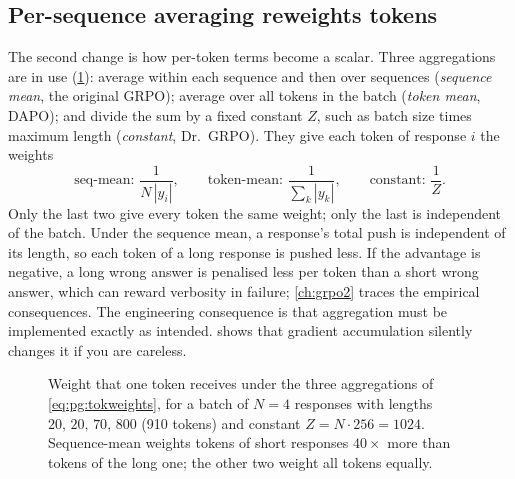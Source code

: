 \subsection{Per-sequence averaging reweights tokens}\label{sec:pg:length}

The second change is how per-token terms become a scalar. Three aggregations are in use
(\cref{fig:pg:weights}): average within each sequence and then over sequences
(\emph{sequence mean}, the original GRPO); average over all tokens in the batch
(\emph{token mean}, DAPO); and divide the sum by a fixed constant $Z$, such as batch size
times maximum length (\emph{constant}, Dr.\ GRPO). They give each token of response $i$ the
weights
\begin{equation}
\text{seq-mean: }\frac{1}{N\,|y_i|},\qquad
\text{token-mean: }\frac{1}{\sum_k|y_k|},\qquad
\text{constant: }\frac{1}{Z}.
\label{eq:pg:tokweights}
\end{equation}
Only the last two give every token the same weight; only the last is independent of the
batch. Under the sequence mean, a response's total push is independent of its length, so each
token of a long response is pushed less. If the advantage is negative, a long wrong answer is
penalised less per token than a short wrong answer, which can reward verbosity in failure;
\cref{ch:grpo2} traces the empirical consequences. The engineering consequence is that
aggregation must be implemented exactly as intended.  shows that
gradient accumulation silently changes it if you are careless.

\begin{figure}[t]
\centering
{}
\caption{Weight that one token receives under the three aggregations of \cref{eq:pg:tokweights},
for a batch of $N=4$ responses with lengths $20,\,20,\,70,\,800$ (910 tokens) and constant
$Z=N\cdot256=1024$. Sequence-mean weights tokens of short responses $40\times$ more than
tokens of the long one; the other two weight all tokens equally.}
\label{fig:pg:weights}
\end{figure}

